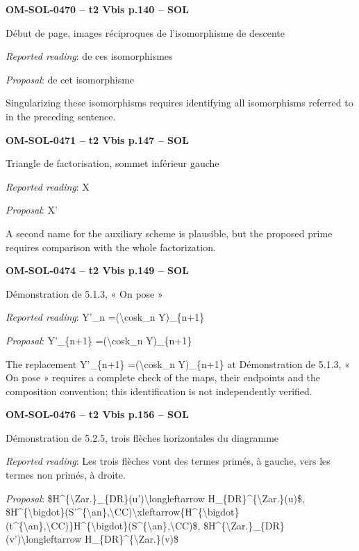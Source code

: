 \par\noindent\textbf{OM-SOL-0470 -- t2 Vbis p.140 -- SOL}\par
Début de page, images réciproques de l'isomorphisme de descente\par
\emph{Reported reading}: de ces isomorphismes\par
\emph{Proposal}: de cet isomorphisme\par
Singularizing these isomorphisms requires identifying all isomorphisms referred to in the preceding sentence.\par
\par\noindent\textbf{OM-SOL-0471 -- t2 Vbis p.147 -- SOL}\par
Triangle de factorisation, sommet inférieur gauche\par
\emph{Reported reading}: X\par
\emph{Proposal}: X'\par
A second name for the auxiliary scheme is plausible, but the proposed prime requires comparison with the whole factorization.\par
\par\noindent\textbf{OM-SOL-0474 -- t2 Vbis p.149 -- SOL}\par
Démonstration de 5.1.3, « On pose »\par
\emph{Reported reading}: Y'\_n =\allowbreak  (\textbackslash{}cosk\_n Y)\_\{n+1\}\par
\emph{Proposal}: Y'\_\{n+1\} =\allowbreak  (\textbackslash{}cosk\_n Y)\_\{n+1\}\par
The replacement Y'\_\{n+1\} =\allowbreak  (\textbackslash{}cosk\_n Y)\_\{n+1\} at Démonstration de 5.1.3, « On pose » requires a complete check of the maps, their endpoints and the composition convention; this identification is not independently verified.\par
\par\noindent\textbf{OM-SOL-0476 -- t2 Vbis p.156 -- SOL}\par
Démonstration de 5.2.5, trois flèches horizontales du diagramme\par
\emph{Reported reading}: Les trois flèches vont des termes primés, à gauche, vers les termes non primés, à droite.\par
\emph{Proposal}: \$H\textasciicircum{}\{\textbackslash{}Zar.\}\_\{DR\}(u')\textbackslash{}longleftarrow H\_\{DR\}\textasciicircum{}\{\textbackslash{}Zar.\}(u)\$, \$H\textasciicircum{}\{\textbackslash{}bigdot\}(S'\textasciicircum{}\{\textbackslash{}an\},\textbackslash{}CC)\textbackslash{}xleftarrow\{H\textasciicircum{}\{\textbackslash{}bigdot\}(t\textasciicircum{}\{\textbackslash{}an\},\textbackslash{}CC)\}H\textasciicircum{}\{\textbackslash{}bigdot\}(S\textasciicircum{}\{\textbackslash{}an\},\textbackslash{}CC)\$, \$H\textasciicircum{}\{\textbackslash{}Zar.\}\_\{DR\}(v')\textbackslash{}longleftarrow H\_\{DR\}\textasciicircum{}\{\textbackslash{}Zar.\}(v)\$\par
